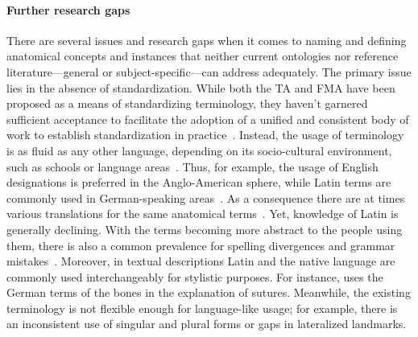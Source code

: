 \documentclass[sw]{iosart2x}
\begin{document}
\paragraph{Further research gaps}\label{sec:gaps+}
There are several issues and research gaps when it comes to naming and defining anatomical concepts and instances that neither current ontologies nor reference literature---general or subject-specific---can address adequately.
%
The primary issue lies in the absence of standardization.
While both the TA and FMA have been proposed as a means of standardizing terminology, they haven't garnered sufficient acceptance to facilitate the adoption of a unified and consistent body of work to establish standardization in practice~\citep{frequencyta,doestamatter,athighlights}.
Instead, the usage of terminology is as fluid as any other language, depending on its socio-cultural environment, such as schools or language areas~\citep{doestamatter,atthennow,atinfo,frequencyta,atcompare}.
Thus, for example, the usage of English designations is preferred in the Anglo-American sphere, while Latin terms are commonly used in German-speaking areas~\citep{anatomycontribution,anatomylexicon,reforminganatomical}.
As a consequence there are at times various translations for the same anatomical terms~\citep{naminggame}.
Yet, knowledge of Latin is generally declining.
With the terms becoming more abstract to the people using them, there is also a common prevalence for spelling divergences and grammar mistakes~\citep{ta17,anatomylexicon,athighlights,diphthongs}.
Moreover, in textual descriptions Latin and the native language are commonly used interchangeably for stylistic purposes.
For instance, \cite{anatomylexicon} uses the German terms of the bones in the explanation of sutures.
Meanwhile, the existing terminology is not flexible enough for language-like usage; for example, there is an inconsistent use of singular and plural forms or gaps in lateralized landmarks.
\end{document}
